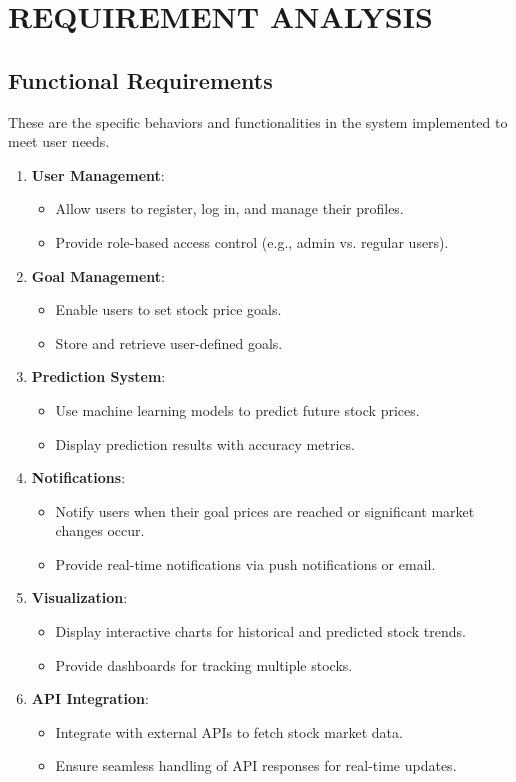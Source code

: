 \chapter{REQUIREMENT ANALYSIS}
\section{Functional Requirements}
These are the specific behaviors and functionalities in the system implemented to meet user needs.
\begin{enumerate}
    \item \textbf{User Management}:
    \begin{itemize}
        \item Allow users to register, log in, and manage their profiles.
        \item Provide role-based access control (e.g., admin vs. regular users).
    \end{itemize}
    \item \textbf{Goal Management}:
    \begin{itemize}
        \item Enable users to set stock price goals.
        \item Store and retrieve user-defined goals.
    \end{itemize}
    \item \textbf{Prediction System}:
    \begin{itemize}
        \item Use machine learning models to predict future stock prices.
        \item Display prediction results with accuracy metrics.
    \end{itemize}
    \item \textbf{Notifications}:
    \begin{itemize}
        \item Notify users when their goal prices are reached or significant market changes occur.
        \item Provide real-time notifications via push notifications or email.
    \end{itemize}
    \item \textbf{Visualization}:
    \begin{itemize}
        \item Display interactive charts for historical and predicted stock trends.
        \item Provide dashboards for tracking multiple stocks.
    \end{itemize}
    \item \textbf{API Integration}:
    \begin{itemize}
        \item Integrate with external APIs to fetch stock market data.
        \item Ensure seamless handling of API responses for real-time updates.
    \end{itemize}
\end{enumerate}

